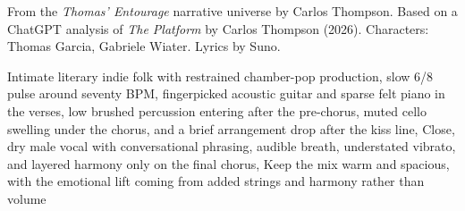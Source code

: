 
\begin{notes}
From the \emph{Thomas’ Entourage} narrative universe by Carlos Thompson. Based on a ChatGPT analysis of \emph{The Platform} by Carlos Thompson (2026). Characters: Thomas Garcia, Gabriele Wiater. Lyrics by Suno.
\end{notes}
\begin{style}
Intimate literary indie folk with restrained chamber-pop production, slow 6/8 pulse around  seventy BPM, fingerpicked acoustic guitar and sparse felt piano in the verses, low brushed percussion entering after the pre-chorus, muted cello swelling under the chorus, and a brief arrangement drop after the kiss line, Close, dry male vocal with conversational phrasing, audible breath, understated vibrato, and layered harmony only on the final chorus, Keep the mix warm and spacious, with the emotional lift coming from added strings and harmony rather than volume
\end{style}
